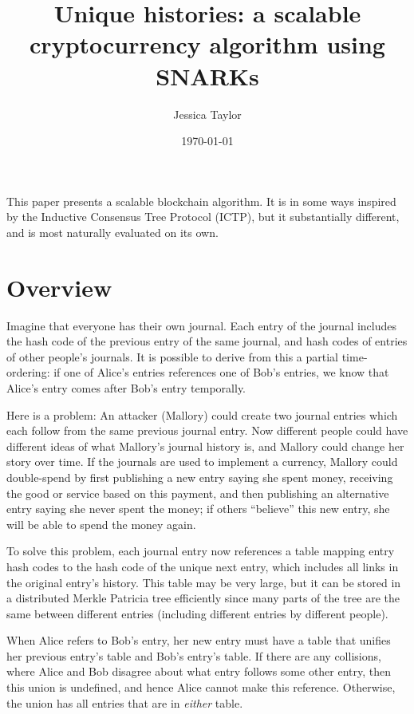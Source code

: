 \documentclass{article}
\title{Unique histories: a scalable cryptocurrency algorithm using SNARKs}
\date{\today}
\author{Jessica Taylor}
\begin{document}
\maketitle

This paper presents a scalable blockchain algorithm.  It is in some ways inspired by the Inductive Consensus Tree Protocol (ICTP), but it substantially different, and is most naturally evaluated on its own.

\section{Overview}

Imagine that everyone has their own journal.  Each entry of the journal includes the hash code of the previous entry of the same journal, and hash codes of entries of other people's journals.  It is possible to derive from this a partial time-ordering: if one of Alice's entries references one of Bob's entries, we know that Alice's entry comes after Bob's entry temporally.

Here is a problem: An attacker (Mallory) could create two journal entries which each follow from the same previous journal entry.  Now different people could have different ideas of what Mallory's journal history is, and Mallory could change her story over time.  If the journals are used to implement a currency, Mallory could double-spend by first publishing a new entry saying she spent money, receiving the good or service based on this payment, and then publishing an alternative entry saying she never spent the money; if others ``believe'' this new entry, she will be able to spend the money again.

To solve this problem, each journal entry now references a table mapping entry hash codes to the hash code of the unique next entry, which includes all links in the original entry's history.  This table may be very large, but it can be stored in a distributed Merkle Patricia tree efficiently since many parts of the tree are the same between different entries (including different entries by different people).

When Alice refers to Bob's entry, her new entry must have a table that unifies her previous entry's table and Bob's entry's table.  If there are any collisions, where Alice and Bob disagree about what entry follows some other entry, then this union is undefined, and hence Alice cannot make this reference.  Otherwise, the union has all entries that are in \emph{either} table.
\end{document}
